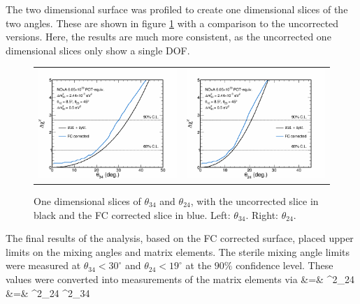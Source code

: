 The two dimensional surface was profiled to create one dimensional slices of the two angles. These are shown in figure \ref{fig:Fit1DFC} with a comparison to the uncorrected versions. Here, the results are much more consistent, as the uncorrected one dimensional slices only show a single DOF.
\begin{figure}[htbp]
  \centering
  \begin{tabular}{c c}
    \includegraphics[width=.47\textwidth]{figures/Fits/1DTh34FCD243Pi2.png} &
    \includegraphics[width=.47\textwidth]{figures/Fits/1DTh24FCD243Pi2.png} \\
  \end{tabular}
  \caption[FC Corrected One Dimensional $\theta_{34}$ and $\theta_{24}$ Slices]{One dimensional slices of $\theta_{34}$ and $\theta_{24}$, with the uncorrected slice in black and the FC corrected slice in blue. Left: $\theta_{34}$. Right: $\theta_{24}$.}
  \label{fig:Fit1DFC}
\end{figure}

The final results of the analysis, based on the FC corrected surface, placed upper limits on the mixing angles and matrix elements. The sterile mixing angle limits were measured at $\theta_{34} < 30^\circ$ and $\theta_{24} < 19^\circ$ at the $90\%$ confidence level. These values were converted into measurements of the matrix elements via
\beqa
{} &=& \sin^2\theta_{24} \nonumber\\
 &=& \cos^2\theta_{24} \sin^2\theta_{34} \label{eq:MatrixResults}
\eeqa

